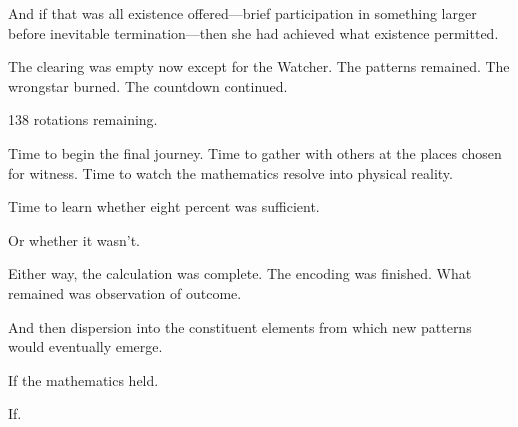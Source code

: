 And if that was all existence offered—brief participation in something larger before inevitable termination—then she had achieved what existence permitted.

The clearing was empty now except for the Watcher. The patterns remained. The wrongstar burned. The countdown continued.

138 rotations remaining.

Time to begin the final journey. Time to gather with others at the places chosen for witness. Time to watch the mathematics resolve into physical reality.

Time to learn whether eight percent was sufficient.

Or whether it wasn't.

Either way, the calculation was complete. The encoding was finished. What remained was observation of outcome.

And then dispersion into the constituent elements from which new patterns would eventually emerge.

If the mathematics held.

If.

